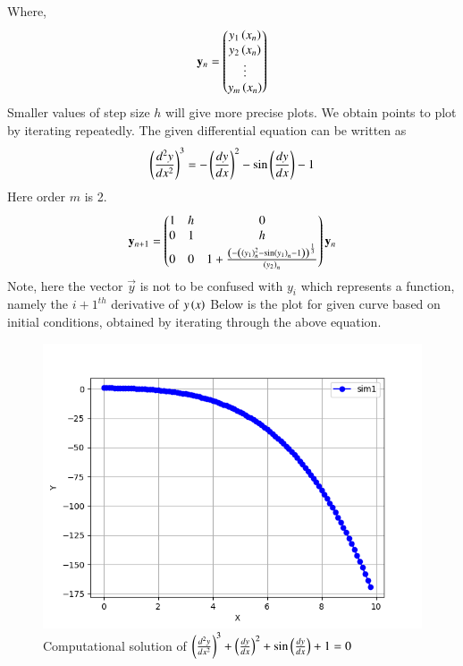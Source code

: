 \documentclass[journal]{IEEEtran}
\begin{document}
Where,
\begin{align}
  \mathbf{y}_n=\begin{pmatrix}y_1\left(x_n\right) \\ y_2\left(x_n\right) \\ \vdots \\ y_m\left(x_n\right)\end{pmatrix}
\end{align}
Smaller values of step size $h$ will give more precise plots. We obtain points to plot by iterating repeatedly. 
The given differential equation can be written as
\begin{align}
    \left(\frac{d^2y}{dx^2}\right)^3 = -\left(\frac{dy}{dx}\right)^2 - \sin{\ensuremath{\left(\frac{dy}{dx}\right)}} - 1 
\end{align}
Here order $m$ is 2.
\begin{align}
  \mathbf{y}_{n+1}=\begin{pmatrix}1 & h & 0 \\ 0 & 1 & h \\ 0 & 0 & 1+\frac{\left(-\left(\left(y_1\right)_n^2 - \sin\left(y_1\right)_n - 1 \right)\right)^{\frac{1}{3}} }{\left(y_2\right)_n}\end{pmatrix}\mathbf{y}_{n}
\end{align}
Note, here the vector $\vec{y}$ is not to be confused with $y_i$ which represents a function, namely the ${i+1}^{th}$ derivative of $y\left(x\right)$ Below is the plot for given curve  based on initial conditions, obtained by iterating through the above equation.

\begin{figure}[h!]
   \centering
   \includegraphics[width=1\columnwidth]{figs/fig1.png}
   \caption{Computational solution of $\left(\frac{d^2y}{dx^2}\right)^3 + \left(\frac{dy}{dx}\right)^2 + \sin{\ensuremath{\left(\frac{dy}{dx}\right)}} + 1 = 0$}
   \label{stemplot}
\end{figure}
\end{document}
